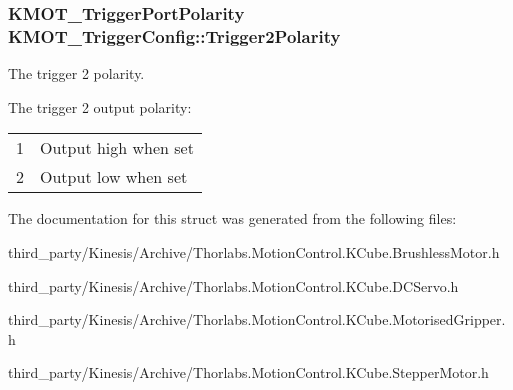 \subsubsection[{\texorpdfstring{Trigger2\+Polarity}{Trigger2Polarity}}]{\setlength{\rightskip}{0pt plus 5cm}K\+M\+O\+T\+\_\+\+Trigger\+Port\+Polarity K\+M\+O\+T\+\_\+\+Trigger\+Config\+::\+Trigger2\+Polarity}\hypertarget{struct_k_m_o_t___trigger_config_a2ad8fdca0dba83c72ccab7fbc5945391}{}\label{struct_k_m_o_t___trigger_config_a2ad8fdca0dba83c72ccab7fbc5945391}


The trigger 2 polarity. 

The trigger 2 output polarity\+: \tabulinesep=1mm
\begin{longtabu} spread 0pt [c]{*2{|X[-1]}|}
&Output high when set \\
2&Output low when set \\
\end{longtabu}


The documentation for this struct was generated from the following files\+:\begin{DoxyCompactItemize}
\item 
third\+\_\+party/\+Kinesis/\+Archive/Thorlabs.\+Motion\+Control.\+K\+Cube.\+Brushless\+Motor.\+h\item 
third\+\_\+party/\+Kinesis/\+Archive/Thorlabs.\+Motion\+Control.\+K\+Cube.\+D\+C\+Servo.\+h\item 
third\+\_\+party/\+Kinesis/\+Archive/Thorlabs.\+Motion\+Control.\+K\+Cube.\+Motorised\+Gripper.\+h\item 
third\+\_\+party/\+Kinesis/\+Archive/Thorlabs.\+Motion\+Control.\+K\+Cube.\+Stepper\+Motor.\+h\end{DoxyCompactItemize}
